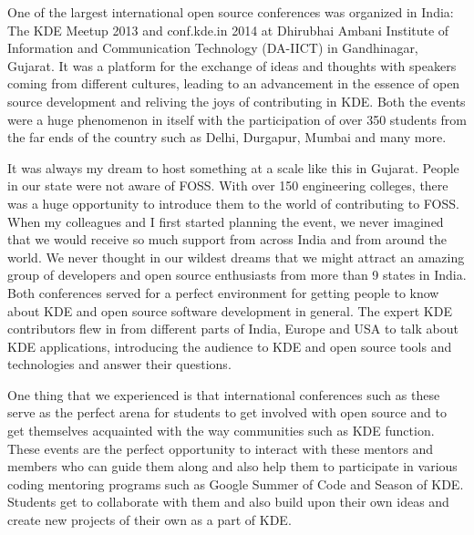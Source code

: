

\noindent{}One of the largest international open source conferences was organized in India: The KDE Meetup 2013 and conf.kde.in 2014 at Dhirubhai Ambani Institute of Information and Communication Technology (DA-IICT) in Gandhinagar, Gujarat. It was a platform for the exchange of ideas and thoughts with speakers coming from different cultures, leading to an advancement in the essence of open source development and reliving the joys of contributing in KDE. Both the events were a huge phenomenon in itself with the participation of over 350 students from the far ends of the country such as Delhi, Durgapur, Mumbai and many more. 

It was always my dream to host something at a scale like this in Gujarat. People in our state were not aware of FOSS. With over 150 engineering colleges, there was a huge opportunity to introduce them to the world of contributing to FOSS. When my colleagues and I first started planning the event, we never imagined that we would receive so much support from across India and from around the world. We never thought in our wildest dreams that we might attract an amazing group of developers and open source enthusiasts from more than 9 states in India. Both conferences served for a perfect environment for getting people to know about KDE and open source software development in general. The expert KDE contributors flew in from different parts of India, Europe and USA to talk about KDE applications, introducing the audience to KDE and open source tools and technologies and answer their questions.

One thing that we experienced is that international conferences such as these serve as the perfect arena for students to get involved with open source and to get themselves acquainted with the way communities such as KDE function. These events are the perfect opportunity to interact with these mentors and members who can guide them along and also help them to participate in various coding mentoring programs such as Google Summer of Code and Season of KDE. Students get to collaborate with them and also build upon their own ideas and create new projects of their own as a part of KDE.

